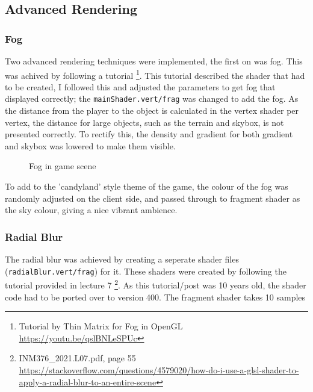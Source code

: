 \documentclass[10pt]{report}
\begin{document}
\subsection*{Advanced Rendering}

\subsubsection*{Fog}
Two advanced rendering techniques were implemented, the first on was fog. This was achived by following a tutorial \footnote{Tutorial by Thin Matrix for Fog in OpenGL \url{https://youtu.be/qslBNLeSPUc}}. This tutorial described the shader that had to be created, I followed this and adjusted the parameters to get fog that displayed correctly; the \colorbox{mygrey}{\lstinline{mainShader.vert/frag}} was changed to add the fog. As the distance from the player to the object is calculated in the vertex shader per vertex, the distance for large objects, such as the terrain and skybox, is not presented correctly. To rectify this, the density and gradient for both gradient and skybox was lowered to make them visible. 

\begin{figure}[H]
    \centering
    \caption{Fog in game scene}
\end{figure}

To add to the 'candyland' style theme of the game, the colour of the fog was randomly adjusted on the client side, and passed through to fragment shader as the sky colour, giving a nice vibrant ambience.

\subsubsection*{Radial Blur}
The radial blur was achieved by creating a seperate shader files (\colorbox{mygrey}{\lstinline{radialBlur.vert/frag}}) for it. These shaders were created by following the tutorial provided in lecture 7 \footnote{INM376\_2021.L07.pdf, page 55 \url{https://stackoverflow.com/questions/4579020/how-do-i-use-a-glsl-shader-to-apply-a-radial-blur-to-an-entire-scene}}. As this tutorial/post was 10 years old, the shader code had to be ported over to version 400. The fragment shader takes 10 samples 
\end{document}
